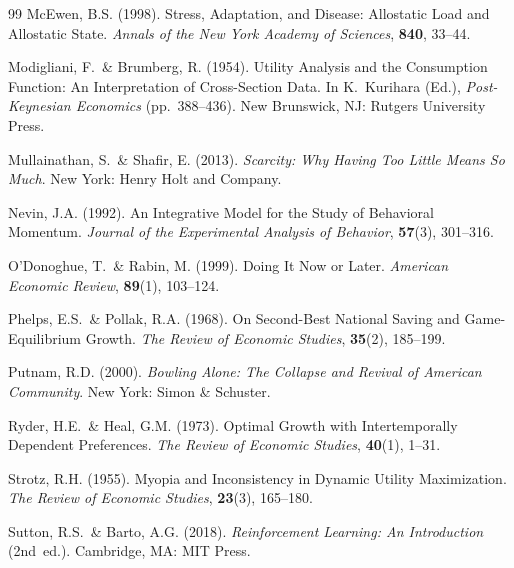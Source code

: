 \documentclass[11pt, a4paper]{article}
\begin{document}
\begin{thebibliography}{99}
  McEwen, B.S. (1998).
  Stress, Adaptation, and Disease: Allostatic Load and Allostatic State.
  \textit{Annals of the New York Academy of Sciences}, \textbf{840}, 33--44.

  Modigliani, F.\ \& Brumberg, R. (1954).
  Utility Analysis and the Consumption Function: An Interpretation of
  Cross-Section Data. In K.~Kurihara (Ed.),
  \textit{Post-Keynesian Economics} (pp.~388--436).
  New Brunswick, NJ: Rutgers University Press.

  Mullainathan, S.\ \& Shafir, E. (2013).
  \textit{Scarcity: Why Having Too Little Means So Much}.
  New York: Henry Holt and Company.

  Nevin, J.A. (1992).
  An Integrative Model for the Study of Behavioral Momentum.
  \textit{Journal of the Experimental Analysis of Behavior},
  \textbf{57}(3), 301--316.

  O'Donoghue, T.\ \& Rabin, M. (1999).
  Doing It Now or Later.
  \textit{American Economic Review}, \textbf{89}(1), 103--124.

  Phelps, E.S.\ \& Pollak, R.A. (1968).
  On Second-Best National Saving and Game-Equilibrium Growth.
  \textit{The Review of Economic Studies}, \textbf{35}(2), 185--199.

  Putnam, R.D. (2000).
  \textit{Bowling Alone: The Collapse and Revival of American Community}.
  New York: Simon \& Schuster.

  Ryder, H.E.\ \& Heal, G.M. (1973).
  Optimal Growth with Intertemporally Dependent Preferences.
  \textit{The Review of Economic Studies}, \textbf{40}(1), 1--31.

  Strotz, R.H. (1955).
  Myopia and Inconsistency in Dynamic Utility Maximization.
  \textit{The Review of Economic Studies}, \textbf{23}(3), 165--180.

  Sutton, R.S.\ \& Barto, A.G. (2018).
  \textit{Reinforcement Learning: An Introduction} (2nd~ed.).
  Cambridge, MA: MIT Press.

\end{thebibliography}
\end{document}

